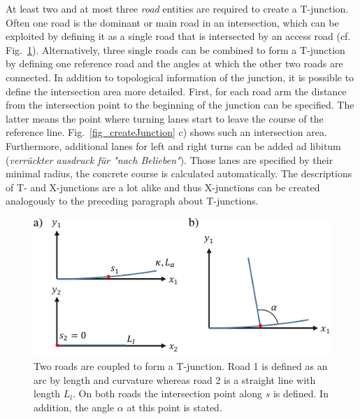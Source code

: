 \documentclass[a4paper, 10pt, conference]{ieeeconf}      %
\begin{document}
At least two and at most three \textit{road} entities are required to create a T-junction. Often one road is the dominant or main road in an intersection, which can be exploited by defining it as a single road that is intersected by an access road (cf. Fig.~\ref{fig_juncDef}). Alternatively, three single roads can be combined to form a T-junction by defining one reference road and the angles at which the other two roads are connected. In addition to topological information of the junction, it is possible to define the intersection area more detailed. First, for each road arm the distance from the intersection point to the beginning of the junction can be specified. The latter means the point where turning lanes start to leave the course of the reference line. Fig.~\ref{fig_createJunction} c) shows such an intersection area. Furthermore, additional lanes for left and right turns can be added ad libitum (\textit{verrückter ausdruck für "nach Belieben"}). Those lanes are specified by their minimal radius, the concrete course is calculated automatically. The descriptions of T- and X-junctions are a lot alike and thus X-junctions can be created analogously to the preceding paragraph about T-junctions.
\begin{figure}[thpb] 		
	\centering
	\includegraphics{fig/junctionDef.pdf}	
	\caption{Two roads are coupled to form a T-junction. Road 1 is defined as an arc by length and curvature whereas road 2 is a straight line with length $L_l$. On both roads the intersection point along $s$ is defined. In addition, the angle $\alpha$ at this point is stated. }
	\label{fig_juncDef}
\end{figure}
\end{document}
